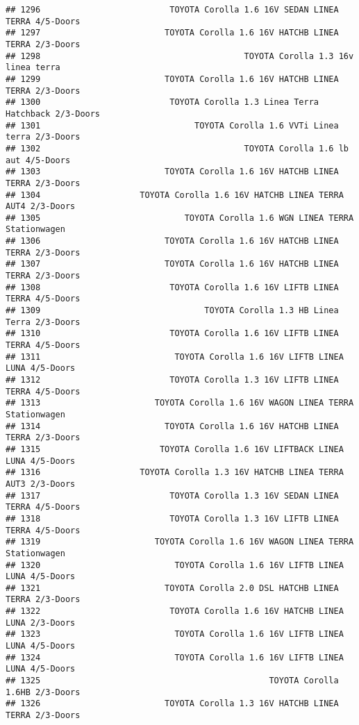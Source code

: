 \documentclass[]{article}
\begin{document}
\begin{verbatim}
## 1296                          TOYOTA Corolla 1.6 16V SEDAN LINEA TERRA 4/5-Doors
## 1297                         TOYOTA Corolla 1.6 16V HATCHB LINEA TERRA 2/3-Doors
## 1298                                         TOYOTA Corolla 1.3 16v linea terra 
## 1299                         TOYOTA Corolla 1.6 16V HATCHB LINEA TERRA 2/3-Doors
## 1300                          TOYOTA Corolla 1.3 Linea Terra Hatchback 2/3-Doors
## 1301                               TOYOTA Corolla 1.6 VVTi Linea terra 2/3-Doors
## 1302                                         TOYOTA Corolla 1.6 lb aut 4/5-Doors
## 1303                         TOYOTA Corolla 1.6 16V HATCHB LINEA TERRA 2/3-Doors
## 1304                    TOYOTA Corolla 1.6 16V HATCHB LINEA TERRA AUT4 2/3-Doors
## 1305                             TOYOTA Corolla 1.6 WGN LINEA TERRA Stationwagen
## 1306                         TOYOTA Corolla 1.6 16V HATCHB LINEA TERRA 2/3-Doors
## 1307                         TOYOTA Corolla 1.6 16V HATCHB LINEA TERRA 2/3-Doors
## 1308                          TOYOTA Corolla 1.6 16V LIFTB LINEA TERRA 4/5-Doors
## 1309                                 TOYOTA Corolla 1.3 HB Linea Terra 2/3-Doors
## 1310                          TOYOTA Corolla 1.6 16V LIFTB LINEA TERRA 4/5-Doors
## 1311                           TOYOTA Corolla 1.6 16V LIFTB LINEA LUNA 4/5-Doors
## 1312                          TOYOTA Corolla 1.3 16V LIFTB LINEA TERRA 4/5-Doors
## 1313                       TOYOTA Corolla 1.6 16V WAGON LINEA TERRA Stationwagen
## 1314                         TOYOTA Corolla 1.6 16V HATCHB LINEA TERRA 2/3-Doors
## 1315                        TOYOTA Corolla 1.6 16V LIFTBACK LINEA LUNA 4/5-Doors
## 1316                    TOYOTA Corolla 1.3 16V HATCHB LINEA TERRA AUT3 2/3-Doors
## 1317                          TOYOTA Corolla 1.3 16V SEDAN LINEA TERRA 4/5-Doors
## 1318                          TOYOTA Corolla 1.3 16V LIFTB LINEA TERRA 4/5-Doors
## 1319                       TOYOTA Corolla 1.6 16V WAGON LINEA TERRA Stationwagen
## 1320                           TOYOTA Corolla 1.6 16V LIFTB LINEA LUNA 4/5-Doors
## 1321                         TOYOTA Corolla 2.0 DSL HATCHB LINEA TERRA 2/3-Doors
## 1322                          TOYOTA Corolla 1.6 16V HATCHB LINEA LUNA 2/3-Doors
## 1323                           TOYOTA Corolla 1.6 16V LIFTB LINEA LUNA 4/5-Doors
## 1324                           TOYOTA Corolla 1.6 16V LIFTB LINEA LUNA 4/5-Doors
## 1325                                              TOYOTA Corolla 1.6HB 2/3-Doors
## 1326                         TOYOTA Corolla 1.3 16V HATCHB LINEA TERRA 2/3-Doors

\end{verbatim}
\end{document}
